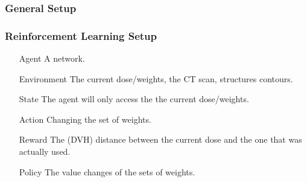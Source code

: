 \documentclass{beamer}
\begin{document}
	\subsubsection{General Setup}
	\begin{frame}
		\frametitle{Reinforcement Learning Setup}
		\hfill
		\begin{minipage}{\dimexpr\textwidth-1cm}
			\begin{itemize}
				\item [Agent] A network.
				\item [Environment] The current dose/weights, the CT scan, structures contours.
				\item [State] The agent will only access the the current dose/weights.
				\item [Action] Changing the set of weights.
				\item [Reward] The (DVH) distance between the current dose and the one that was actually used.
				\item [Policy] The value changes of the sets of weights.
			\end{itemize}
			\xdef\tpd{\the\prevdepth}
		\end{minipage}
		
	\end{frame}
\end{document}
